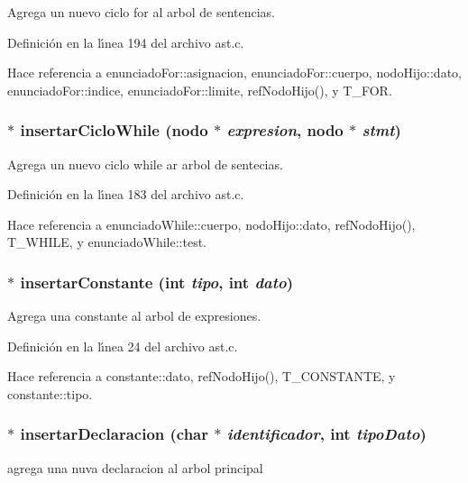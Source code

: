 Agrega un nuevo ciclo for al arbol de sentencias. 



Definici\'{o}n en la l\'{\i}nea 194 del archivo ast.c.

Hace referencia a enunciado\-For::asignacion, enunciado\-For::cuerpo, nodo\-Hijo::dato, enunciado\-For::indice, enunciado\-For::limite, ref\-Nodo\-Hijo(), y T\_\-FOR.
\subsubsection{$\ast$ insertar\-Ciclo\-While ({\bf nodo} $\ast$ {\em expresion}, {\bf nodo} $\ast$ {\em stmt})}\label{ast_8c_a12}


Agrega un nuevo ciclo while ar arbol de sentecias. 



Definici\'{o}n en la l\'{\i}nea 183 del archivo ast.c.

Hace referencia a enunciado\-While::cuerpo, nodo\-Hijo::dato, ref\-Nodo\-Hijo(), T\_\-WHILE, y enunciado\-While::test.
\subsubsection{$\ast$ insertar\-Constante (int {\em tipo}, int {\em dato})}\label{ast_8c_a2}


Agrega una constante al arbol de expresiones. 



Definici\'{o}n en la l\'{\i}nea 24 del archivo ast.c.

Hace referencia a constante::dato, ref\-Nodo\-Hijo(), T\_\-CONSTANTE, y constante::tipo.
\subsubsection{$\ast$ insertar\-Declaracion (char $\ast$ {\em identificador}, int {\em tipo\-Dato})}\label{ast_8c_a10}


agrega una nuva declaracion al arbol principal 



